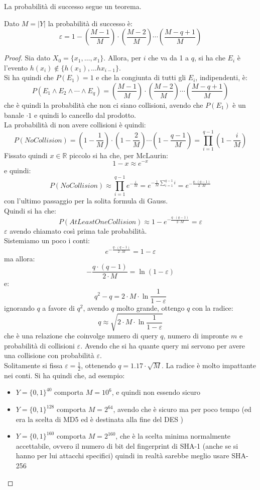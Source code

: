 \documentclass[a4paper,12pt, oneside]{book}
\begin{document}
La probabilità di successo segue un teorema.
\begin{teorema}
  Dato $M=|Y|$ la probabilità di successo è:
  \[\varepsilon=1-\left(\frac{M-1}{M}\right)\cdot
    \left(\frac{M-2}{M}\right)\cdots \left(\frac{M-q+1}{M}\right)\]
\end{teorema}
\begin{proof}
  Sia dato $X_0=\{x_1,\ldots, x_1\}$. Allora, per $i$ che va da 1 a $q$, si ha
  che $E_i$ è l'evento $h(x_i)\not\in\{h(x_1),\ldots h{x_{i-1}}\}$.\\
  Si ha quindi che $P(E_1)=1$ e che la congiunta di tutti gli $E_i$,
  indipendenti, è:
  \[P(E_1\land E_2\land\cdots\land E_q)=\left(\frac{M-1}{M}\right)\cdot
    \left(\frac{M-2}{M}\right)\cdots \left(\frac{M-q+1}{M}\right)\]
  che è quindi la probabilità che non ci siano collisioni, avendo che $P(E_1)$
  è un banale $\cdot 1$ e quindi lo cancello dal prodotto. \\
  La probabilità di non avere collisioni è quindi:
  \[P(NoCollision)=\left(1-\frac{1}{M}\right)\cdot
    \left(1-\frac{2}{M}\right)\cdots\left(1-\frac{q-1}{M}\right)=
    \prod_{i=1}^{q-1}\left(1-\frac{i}{M}\right)\]
  Fissato quindi $x\in\mathbb{R}$ piccolo si ha che, per McLaurin:
  \[1-x\approx e^{-x}\]
  e quindi:
  \[P(NoCollision)\approx \prod_{i=1}^{q-1}
    e^{-\frac{i}{M}}=e^{-\frac{1}{M}\sum_{i=1}^{q-1} i}=e^{-\frac{q\cdot
        (q-1)}{2\cdot M}}\]
  con l'ultimo passaggio per la solita formula di Gauss.\\
  Quindi si ha che:
  \[P(AtLeastOneCollision)\approx 1-e^{-\frac{q\cdot
        (q-1)}{2\cdot M}}=\varepsilon\]
  $\varepsilon$ avendo chiamato così prima tale probabilità.\\
  Sistemiamo un poco i conti:
  \[e^{-\frac{q\cdot
        (q-1)}{2\cdot M}}=1-\varepsilon\]
  ma allora:
  \[-\frac{q\cdot
      (q-1)}{2\cdot M}=\ln(1-\varepsilon)\]
  e:
  \[q^2-q=2\cdot M\cdot \ln\frac{1}{1-\varepsilon}\]
  ignorando $q$ a favore di $q^2$, avendo $q$ molto grande, ottengo $q$ con la
  radice: 
  \[q\approx \sqrt{2\cdot M\cdot \ln\frac{1}{1-\varepsilon}}\]
  che è una relazione che coinvolge numero di query $q$, numero di impronte $m$
  e probabilità di collisioni $\varepsilon$. Avendo che si ha quante query mi
  servono per avere una collisione con probabilità $\varepsilon$.\\
  Solitamente si fissa $\varepsilon=\frac{1}{2}$, ottenendo $q=1.17\cdot
  \sqrt{M}$. La radice è molto impattante nei conti. Si ha quindi che, ad
  esempio: 
  \begin{itemize}
    \item $Y=\{0,1\}^{40}$ comporta $M=10^6$, e quindi non essendo sicuro
    \item $Y=\{0,1\}^{128}$ comporta $M=2^{64}$, avendo che è sicuro ma per poco
    tempo (ed era la scelta di MD5 ed è destinata alla fine del DES )
    \item $Y=\{0,1\}^{160}$ comporta $M=2^{160}$, che è la scelta minima
    normalmente accettabile, ovvero il numero di bit del fingerprint di SHA-1
    (anche se si hanno per lui attacchi specifici) quindi in realtà sarebbe
    meglio usare SHA-256
  \end{itemize}
\end{proof}
\end{document}
